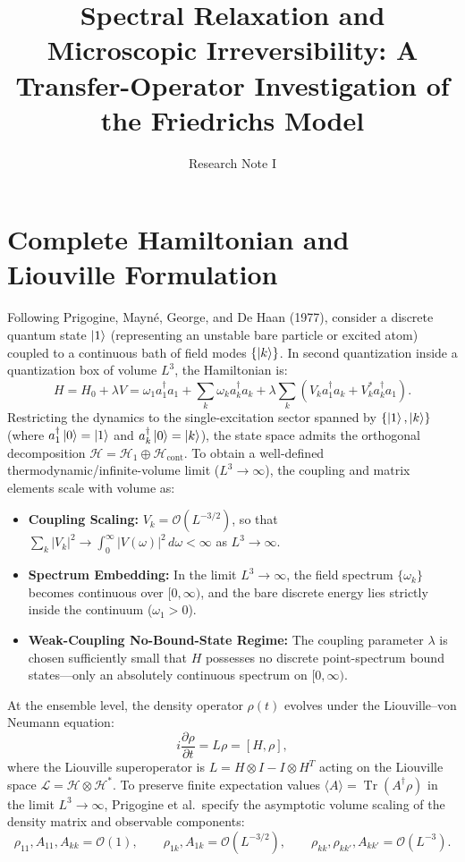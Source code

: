 \documentclass[11pt,a4paper]{article}
\title{\textbf{Spectral Relaxation and Microscopic Irreversibility: A Transfer-Operator Investigation of the Friedrichs Model}}
\author{Research Note I}
\date{}
\begin{document}
\maketitle

\section{Complete Hamiltonian and Liouville Formulation}

Following Prigogine, Mayn\'e, George, and De Haan (1977), consider a discrete quantum state $\ket{1}$ (representing an unstable bare particle or excited atom) coupled to a continuous bath of field modes $\{\ket{k}\}$. In second quantization inside a quantization box of volume $L^3$, the Hamiltonian is:
\begin{equation}
H = H_0 + \lambda V = \omega_1 a_1^\dagger a_1 + \sum_k \omega_k a_k^\dagger a_k + \lambda \sum_k \left( V_k a_1^\dagger a_k + V_k^* a_k^\dagger a_1 \right).
\end{equation}
Restricting the dynamics to the single-excitation sector spanned by $\{\ket{1}, \ket{k}\}$ (where $a_1^\dagger \ket{0} = \ket{1}$ and $a_k^\dagger \ket{0} = \ket{k}$), the state space admits the orthogonal decomposition $\mathcal{H} = \mathcal{H}_1 \oplus \mathcal{H}_{\mathrm{cont}}$. To obtain a well-defined thermodynamic/infinite-volume limit ($L^3 \to \infty$), the coupling and matrix elements scale with volume as:
\begin{itemize}
    \item \textbf{Coupling Scaling:} $V_k = \mathcal{O}(L^{-3/2})$, so that $\sum_k |V_k|^2 \to \int_0^\infty |V(\omega)|^2 \, d\omega < \infty$ as $L^3 \to \infty$.
    \item \textbf{Spectrum Embedding:} In the limit $L^3 \to \infty$, the field spectrum $\{\omega_k\}$ becomes continuous over $[0, \infty)$, and the bare discrete energy lies strictly inside the continuum ($\omega_1 > 0$).
    \item \textbf{Weak-Coupling No-Bound-State Regime:} The coupling parameter $\lambda$ is chosen sufficiently small that $H$ possesses no discrete point-spectrum bound states---only an absolutely continuous spectrum on $[0, \infty)$.
\end{itemize}

At the ensemble level, the density operator $\rho(t)$ evolves under the Liouville--von Neumann equation:
\begin{equation}
i\frac{\partial \rho}{\partial t} = L\rho = [H, \rho],
\end{equation}
where the Liouville superoperator is $L = H \otimes I - I \otimes H^T$ acting on the Liouville space $\mathcal{L} = \mathcal{H} \otimes \mathcal{H}^*$. To preserve finite expectation values $\langle A \rangle = \operatorname{Tr}(A^\dagger \rho)$ in the limit $L^3 \to \infty$, Prigogine et al.\ specify the asymptotic volume scaling of the density matrix and observable components:
\begin{equation}
\rho_{11}, A_{11}, A_{kk} = \mathcal{O}(1), \qquad \rho_{1k}, A_{1k} = \mathcal{O}(L^{-3/2}), \qquad \rho_{kk}, \rho_{kk'}, A_{kk'} = \mathcal{O}(L^{-3}).
\end{equation}
\end{document}

